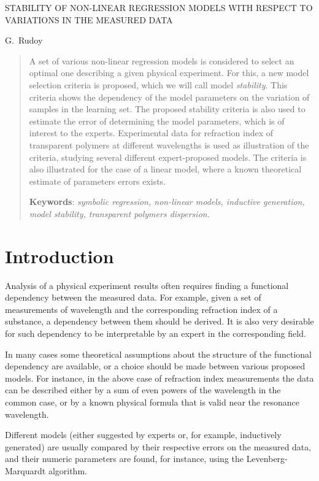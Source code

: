 \documentclass[11pt,a4paper]{article}
\theoremstyle{definition}
\begin{document}
\begin{center}
  STABILITY OF NON-LINEAR REGRESSION MODELS WITH RESPECT TO VARIATIONS IN THE MEASURED DATA

  \bigskip
  G.~Rudoy
\end{center}

\begin{abstract}
  A set of various non-linear regression models is considered to select an optimal one
  describing a given physical experiment.
  For this, a new model selection criteria is proposed, which we will call model \emph{stability}.
  This criteria shows the dependency of the model parameters on the variation of samples in
  the learning set.
  The proposed stability criteria is also used to estimate the error of determining the model
  parameters, which is of interest to the experts.
  Experimental data for refraction index of transparent polymers at different wavelengths is
  used as illustration of the criteria, studying several different expert-proposed models.
  The criteria is also illustrated for the case of a linear model, where a known theoretical
  estimate of parameters errors exists.

  \bigskip
  \textbf{Keywords}: \emph{symbolic regression, non-linear models, inductive generation,
	model stability, transparent polymers dispersion.}
\end{abstract}

\section*{Introduction}

Analysis of a physical experiment results often requires finding a functional
dependency between the measured data. For example, given a set of measurements
of wavelength and the corresponding refraction index of a substance, a dependency
between them should be derived. It is also very desirable for such dependency to
be interpretable by an expert in the corresponding field.

In many cases some
theoretical assumptions about the structure of the functional dependency are available,
or a choice should be made between various proposed models. For instance, in the above
case of refraction index measurements the data can be described either by a sum
of even powers of the wavelength in the common case, or by a known physical formula
that is valid near the resonance wavelength.

Different models (either suggested by experts or, for example, inductively generated\citep{davidson:2000:snrea,Rudoy13})
are usually compared by their respective errors on the measured data,
and their numeric parameters are found, for instance, using
the Levenberg-Marquardt algorithm\citep{Marquardt1963Algorithm,more:78}.
\end{document}
